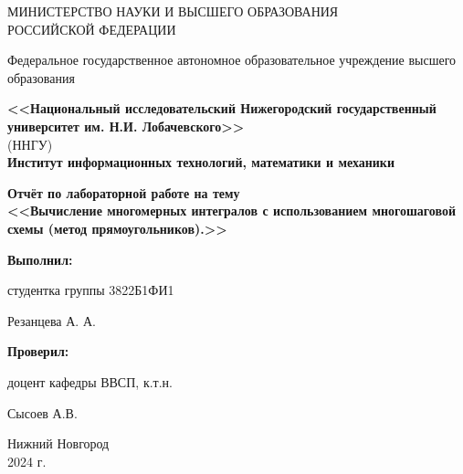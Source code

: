 \documentclass[12pt]{article}
\begin{document}
\begin{titlepage}
	\begin{center}
		\large
		{МИНИСТЕРСТВО НАУКИ И ВЫСШЕГО ОБРАЗОВАНИЯ\\ РОССИЙСКОЙ ФЕДЕРАЦИИ}
		
		Федеральное государственное автономное образовательное учреждение высшего образования
		\vspace{0.5cm}
		
		\textbf{<<Национальный исследовательский Нижегородский государственный университет им. Н.И. Лобачевского>>}\\
		(ННГУ)\\
		\vspace{1cm}
		\textbf{Институт информационных технологий, математики и механики}\\
		\vspace{1cm}
		
		
		\vfill
		
		\vfill
		
		\Large
		\textbf{Отчёт по лабораторной работе на тему} \\
		\textbf{<<Вычисление многомерных интегралов с использованием многошаговой схемы (метод прямоугольников).>>}
		{\LARGE 
		}
		\bigskip
		
		
	\end{center}
	\vfill
	
	\hfill\begin{minipage}{0.4\textwidth}
		\textbf{Выполнил:} 

            студентка группы 3822Б1ФИ1

            \underline{\hspace{3cm}} Резанцева А. А. \bigskip
            
	\end{minipage}%
	
	\hfill\begin{minipage}{0.4\textwidth}
		\textbf{Проверил:}

           доцент кафедры ВВСП, к.т.н.
           
           \underline{\hspace{3cm}} Сысоев А.В.\bigskip
	\end{minipage}%
	\vfill
	
	\begin{center}
		Нижний Новгород\\
		2024 г.
	\end{center}
\end{titlepage}
\thispagestyle{empty} %
\tableofcontents
\end{document}
